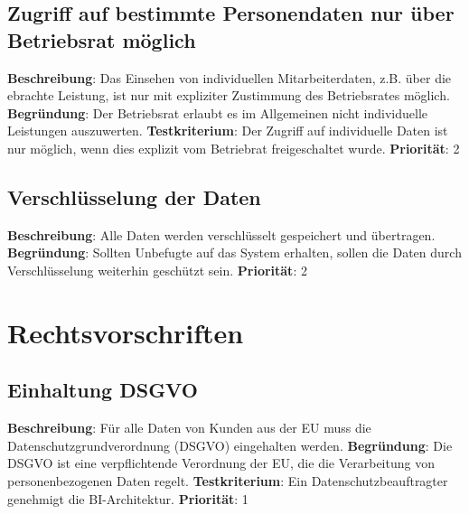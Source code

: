 \subsection{Zugriff auf bestimmte Personendaten nur über Betriebsrat möglich} \label{sec:anforderungsspezifikation:}
\textbf{Beschreibung}: Das Einsehen von individuellen Mitarbeiterdaten, z.B. über die ebrachte Leistung, ist nur mit expliziter Zustimmung des Betriebsrates möglich.
\newline \textbf{Begründung}: Der Betriebsrat erlaubt es im Allgemeinen nicht individuelle Leistungen auszuwerten.
\newline \textbf{Testkriterium}: Der Zugriff auf individuelle Daten ist nur möglich, wenn dies explizit vom Betriebrat freigeschaltet wurde. 
\newline \textbf{Priorität}: 2

\subsection{Verschlüsselung der Daten} \label{sec:anforderungsspezifikation:}
\textbf{Beschreibung}: Alle Daten werden verschlüsselt gespeichert und übertragen.
\newline \textbf{Begründung}: Sollten Unbefugte auf das System erhalten, sollen die Daten durch Verschlüsselung weiterhin geschützt sein.
\newline \textbf{Priorität}: 2

\section{Rechtsvorschriften}

\subsection{Einhaltung DSGVO} \label{sec:anforderungsspezifikation:}
\textbf{Beschreibung}: Für alle Daten von Kunden aus der EU muss die Datenschutzgrundverordnung (DSGVO) eingehalten werden.
\newline \textbf{Begründung}: Die DSGVO ist eine verpflichtende Verordnung der EU, die die Verarbeitung von personenbezogenen Daten regelt.
\newline \textbf{Testkriterium}: Ein Datenschutzbeauftragter genehmigt die BI-Architektur.
\newline \textbf{Priorität}: 1